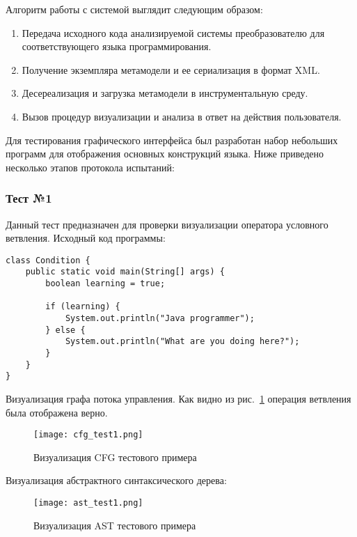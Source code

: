 Алгоритм работы с системой выглядит следующим образом:

\begin{enumerate}
    \item Передача исходного кода анализируемой системы преобразователю для
    соответствующего языка программирования.
    \item Получение экземпляра метамодели и ее сериализация в формат XML.
    \item Десереализация и загрузка метамодели в инструментальную среду.
    \item Вызов процедур визуализации и анализа в ответ на действия пользователя.
\end{enumerate}

Для тестирования графического интерфейса был разработан набор небольших программ
для отображения основных конструкций языка. Ниже приведено несколько этапов
протокола испытаний:

\subsubsection{Тест №1}

Данный тест предназначен для проверки визуализации оператора условного ветвления.
Исходный код программы:

\begin{lstlisting}[caption={Тестовая программа}]
class Condition {
    public static void main(String[] args) {
        boolean learning = true;

        if (learning) {
            System.out.println("Java programmer");
        } else {
            System.out.println("What are you doing here?");
        }
    }
}
\end{lstlisting}

Визуализация графа потока управления. Как видно из рис.~\ref{fig:cfg_test1}
операция ветвления была отображена верно.

\newpage
\begin{figure}[h]
    \begin{center}
        \texttt{[image: cfg\_test1.png]}
    \end{center}
    \caption{Визуализация CFG тестового примера}
    \label{fig:cfg_test1}
\end{figure}

Визуализация абстрактного синтаксического дерева:

\begin{figure}[h]
    \begin{center}
        \texttt{[image: ast\_test1.png]}
    \end{center}
    \caption{Визуализация AST тестового примера}
    \label{fig:ast_test1}
\end{figure}

